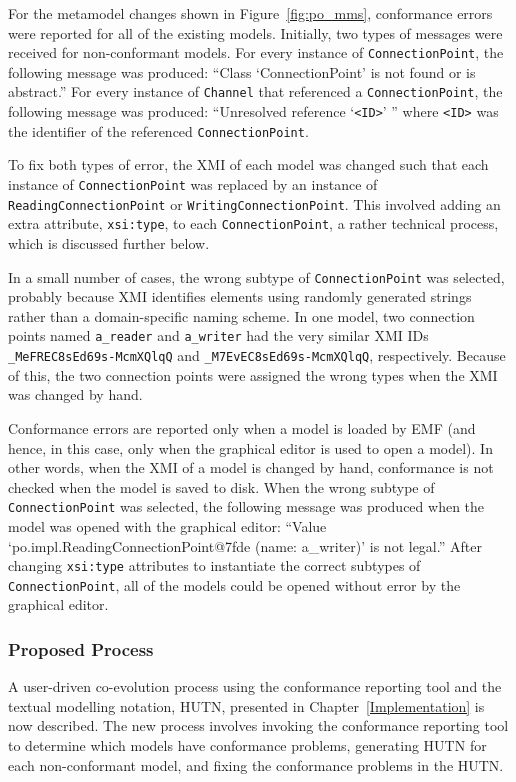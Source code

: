 For the metamodel changes shown in Figure~\ref{fig:po_mms}, conformance errors were reported for all of the existing models. Initially, two types of messages were received for non-conformant models. For every instance of \texttt{Co\-nn\-ec\-ti\-o\-nPo\-i\-nt}, the following message was produced: ``Class `ConnectionPoint' is not found or is abstract.'' For every instance of \texttt{Ch\-an\-n\-el} that referenced a \texttt{Co\-nn\-ec\-ti\-o\-nPo\-i\-nt}, the following message was produced: ``Unresolved reference `\texttt{<ID>}' '' where \texttt{<ID>} was the identifier of the referenced \texttt{Co\-nn\-ec\-ti\-o\-nPo\-i\-nt}.

To fix both types of error, the XMI of each model was changed such that each instance of \texttt{Co\-nn\-ec\-ti\-onPo\-in\-t} was replaced by an instance of \texttt{Re\-ad\-i\-ngCo\-nn\-ec\-ti\-o\-nPo\-i\-nt} or \texttt{Wr\-i\-ti\-ngCo\-nn\-ec\-ti\-o\-nPo\-i\-nt}. This involved adding an extra attribute, \texttt{xsi:type}, to each \texttt{Co\-nn\-ec\-ti\-onPo\-in\-t}, a rather technical process, which is discussed further below.

In a small number of cases, the wrong subtype of \texttt{Co\-nn\-ec\-ti\-onPo\-in\-t} was selected, probably because XMI identifies elements using randomly generated strings rather than a domain-specific naming scheme. In one model, two connection points named \texttt{a\_reader} and \texttt{a\_writer} had the very similar XMI IDs \texttt{\_MeFREC8sEd69s-McmXQlqQ} and \texttt{\_M7EvEC8sEd69s-McmXQlqQ}, respectively. Because of this, the two connection points were assigned the wrong types when the XMI was changed by hand.

Conformance errors are reported only when a model is loaded by EMF (and hence, in this case, only when the graphical editor is used to open a model). In other words, when the XMI of a model is changed by hand, conformance is not checked when the model is saved to disk. When the wrong subtype of  \texttt{Co\-nn\-ec\-ti\-onPo\-in\-t} was selected, the following message was produced when the model was opened with the graphical editor: ``Value `po.im\-pl.Re\-ad\-i\-ngCo\-nn\-ec\-ti\-onPo\-i\-nt@7f\-de (name: a\_writer)' is not legal.'' After changing \texttt{xsi:type} attributes to instantiate the correct subtypes of \texttt{Co\-nn\-ec\-ti\-onPo\-in\-t}, all of the models could be opened without error by the graphical editor.


\subsubsection{Proposed Process}
A user-driven co-evolution process using the conformance reporting tool and the textual modelling notation, HUTN, presented in Chapter~\ref{Implementation} is now described. The new process involves invoking the conformance reporting tool to determine which models have conformance problems, generating HUTN for each non-conformant model, and fixing the conformance problems in the HUTN.

